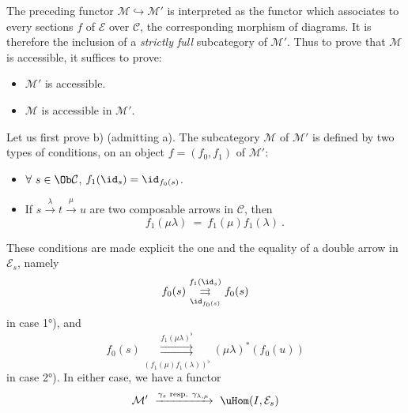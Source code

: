 The preceding functor $\mathcal{M} \hookrightarrow \mathcal{M}'$ is interpreted as the functor which associates to every sections $f$ of $\mathcal{E}$ over $\mathcal{C}$, the corresponding morphism of diagrams. It is therefore the inclusion of a \textit{strictly full} subcategory of $\mathcal{M}'$. Thus to prove that $\mathcal{M}$ is accessible, it suffices to prove: %
\begin{itemize}[leftmargin=2.5em]
\item[a)] $\mathcal{M}'$ is accessible.
\item[b)] $\mathcal{M}$ is accessible in $\mathcal{M}'$.
\end{itemize}
Let us first prove b) (admitting a). The subcategory $\mathcal{M}$ of $\mathcal{M}'$ is defined by two types of conditions, on an object $f = (f_0,f_1)$ of $\mathcal{M}'$:
\begin{itemize}[leftmargin=2.5em]
\item[1°)] $\forall\ s \in \Ob\mathcal{C}$, $f_1(\id_s) = \id_{f_0(s)}$.
\item[2°)] If $s \xrightarrow{\lambda} t \xrightarrow{\mu} u$ are two composable arrows in $\mathcal{C}$, then
\[
f_1(\mu\lambda) \ = \ f_1(\mu)f_1(\lambda) \ .
\]
\end{itemize}
These conditions are made explicit the one and the equality of a double arrow in $\mathcal{E}_s$,
namely
\[
f_0(s) \overset{f_1(\id_s)}{\underset{\id_{f_0(s)}}{\rightrightarrows}} f_0(s)
\]
in case 1°), and
\[
f_0(s) \overset{f_1(\mu\lambda)^\flat}{\underset{(f_1(\mu)f_1(\lambda))^\flat}{\rightrightarrows}} (\mu\lambda)^*(f_0(u))
\]
in case 2°). In either case, we have a functor
\[
\mathcal{M}' \ \xrightarrow{\gamma_s \text{ resp. } \gamma_{\lambda,\mu}} \ \uHom(I,\mathcal{E}_s)
\]
